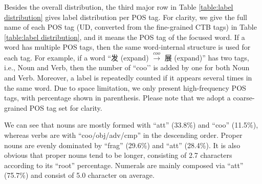 Besides the overall distribution, the third major row in Table \ref{table:label distribution} gives label distribution per POS tag.
For clarity, we give the full name of each POS tag (UD, converted from the fine-grained CTB tags) in Table \ref{table:label distribution}, and it means the POS tag of the focused word.
If a word has multiple POS tags, then the same word-internal structure is used for each tag. For example, if a word ``发 (expand) $\xrightarrow{coo}$ 展 (expand)'' has two tags, i.e., Noun and Verb, then the number of ``coo’’ is added by one for both Noun and Verb.
Moreover, a label is repeatedly counted if it appears several times in the same word. 
Due to space limitation, we only present high-frequency POS tags, with percentage shown in parenthesis. 
Please note that we adopt a coarse-grained POS tag set for clarity.

We can see that nouns are mostly formed with ``att'' (33.8\%) and ``coo'' (11.5\%), whereas verbs are with ``coo/obj/adv/cmp'' in the descending order. Proper nouns are evenly dominated by ``frag'' (29.6\%) and ``att'' (28.4\%). It is also obvious that proper nouns tend to be longer, consisting of 2.7 characters according to its ``root'' percentage. 
Numerals are mainly composed via ``att'' (75.7\%) and consist of 5.0 character on average. 

